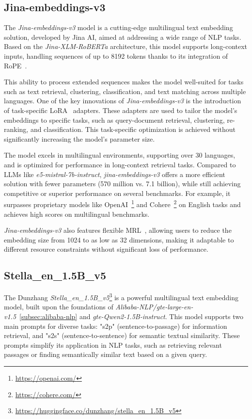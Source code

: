 \subsection{Jina-embeddings-v3}\label{subsec:jinaai}
The \textit{Jina-embeddings-v3} model is a cutting-edge multilingual text embedding solution, developed by Jina AI, aimed at addressing a wide range of \ac{NLP} tasks.
Based on the \textit{Jina-XLM-RoBERTa} architecture, this model supports long-context inputs, handling sequences of up to 8192 tokens thanks to its integration of \ac{RoPE}~\cite{su2023roformerenhancedtransformerrotary,sturua2024jinaembeddingsv3multilingualembeddingstask}.

This ability to process extended sequences makes the model well-suited for tasks such as text retrieval, clustering, classification, and text matching across multiple languages.
One of the key innovations of \textit{Jina-embeddings-v3} is the introduction of task-specific \ac{LoRA}~\cite{hu2022lora} adapters.
These adapters are used to tailor the model's embeddings to specific tasks, such as query-document retrieval, clustering, re-ranking, and classification.
This task-specific optimization is achieved without significantly increasing the model's parameter size.

The model excels in multilingual environments, supporting over 30 languages, and is optimized for performance in long-context retrieval tasks.
Compared to LLMs like \textit{e5-mistral-7b-instruct}, \textit{jina-embeddings-v3} offers a more efficient solution with fewer parameters (570 million vs. 7.1 billion), while still achieving competitive or superior performance on several benchmarks.
For example, it surpasses proprietary models like OpenAI~\footnote{\url{https://openai.com/}} and Cohere~\footnote{\url{https://cohere.com/}} on English tasks and achieves high scores on multilingual benchmarks.

\textit{Jina-embeddings-v3} also features flexible \ac{MRL}~\cite{kusupati2024matryoshkarepresentationlearning}, allowing users to reduce the embedding size from 1024 to as low as 32 dimensions, making it adaptable to different resource constraints without significant loss of performance.

\subsection{Stella\_en\_1.5B\_v5}\label{subsec:dunzhang}
The Dunzhang \textit{Stella\_en\_1.5B\_v5}\footnote{\url{https://huggingface.co/dunzhang/stella_en_1.5B_v5}} is a powerful multilingual text embedding model, built upon the foundations of \textit{Alibaba-NLP/gte-large-en-v1.5}~\ref{subsec:alibaba-nlp} and \textit{gte-Qwen2-1.5B-instruct}.
This model supports two main prompts for diverse tasks: "s2p" (sentence-to-passage) for information retrieval, and "s2s" (sentence-to-sentence) for semantic textual similarity. 
These prompts simplify its application in NLP tasks, such as retrieving relevant passages or finding semantically similar text based on a given query.

